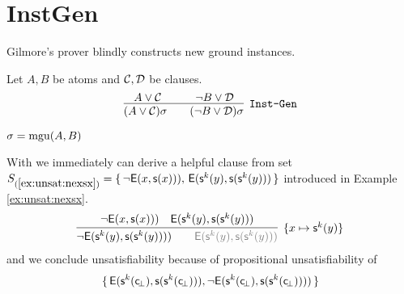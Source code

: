 \section{InstGen}

Gilmore's prover blindly constructs new ground instances. 

\begin{definition}[\InstGen] Let $A, B$ be atoms and ${\mathcal C},{\mathcal D}$ be clauses.
	\begin{gather*}
	\infer
	[{\InstGen}] 
	{(A\lor\mathcal C)\sigma\qquad (\lnot B\lor\mathcal D)\sigma}
	{A\lor\mathcal C\quad&\quad \lnot B\lor\mathcal D}
	\end{gather*}
	\begin{center}$\sigma=\operatorname{mgu}(A,B)$
	\end{center}
\end{definition}

\begin{example}
	With \InstGen we immediately can derive a helpful clause from set
$S_{(\ref{ex:unsat:nexsx})} =
\{\,
{ \lnot{\mathsf{E}}(x, {\mathsf s}(x)))},\, 
{ {\mathsf{E}}({\mathsf s}^k(y), {\mathsf s}({\mathsf s}^k(y)))}
\,\}$ 
 introduced in Example \ref{ex:unsat:nexsx}. 
\begin{gather*}
\infer[\{x\mapsto\msucc^k(y)\}]{
	{ \lnot\mE(\msucc^k(y), \msucc(\msucc^k(y))))} \qquad
	{\colG \mE(\msucc^k(y), \msucc(\msucc^k(y)))}
}{
	{ \lnot\mE(x, \msucc(x)))} &
	{ \mE(\msucc^k(y), \msucc(\msucc^k(y)))}
}
\end{gather*}
and we conclude unsatisfiability because of propositional unsatisfiability of 
\begin{gather*}
\{\,
	{\mathsf{E}}({\mathsf s}^k({\mathsf c}\!_\bot), {\mathsf s}({\mathsf s}^k({\mathsf c}\!_\bot))), \lnot{\mathsf{E}}({\mathsf s}^k({\mathsf c}\!_\bot), {\mathsf s}({\mathsf s}^k({\mathsf c}\!_\bot)))) 
\,\}
\end{gather*}
	
\end{example}

